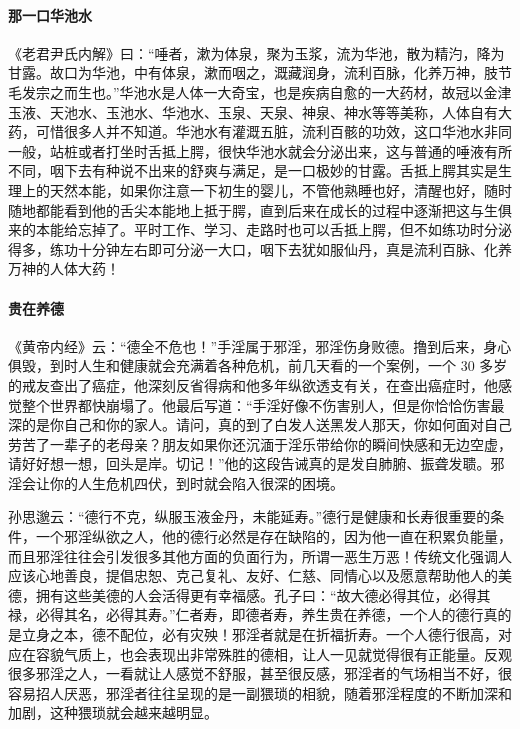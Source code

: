 \paragraph{那一口华池水}

《老君尹氏内解》曰：“唾者，漱为体泉，聚为玉浆，流为华池，散为精汋，降为甘露。故口为华池，中有体泉，漱而咽之，溉藏润身，流利百脉，化养万神，肢节毛发宗之而生也。”华池水是人体一大奇宝，也是疾病自愈的一大药材，故冠以金津玉液、天池水、玉池水、华池水、玉泉、天泉、神泉、神水等等美称，人体自有大药，可惜很多人并不知道。华池水有灌溉五脏，流利百骸的功效，这口华池水非同一般，站桩或者打坐时舌抵上腭，很快华池水就会分泌出来，这与普通的唾液有所不同，咽下去有种说不出来的舒爽与满足，是一口极妙的甘露。舌抵上腭其实是生理上的天然本能，如果你注意一下初生的婴儿，不管他熟睡也好，清醒也好，随时随地都能看到他的舌尖本能地上抵于腭，直到后来在成长的过程中逐渐把这与生俱来的本能给忘掉了。平时工作、学习、走路时也可以舌抵上腭，但不如练功时分泌得多，练功十分钟左右即可分泌一大口，咽下去犹如服仙丹，真是流利百脉、化养万神的人体大药！

\paragraph{贵在养德}

《黄帝内经》云：“德全不危也！”手淫属于邪淫，邪淫伤身败德。撸到后来，身心俱毁，到时人生和健康就会充满着各种危机，前几天看的一个案例，一个 30 多岁的戒友查出了癌症，他深刻反省得病和他多年纵欲透支有关，在查出癌症时，他感觉整个世界都快崩塌了。他最后写道：“手淫好像不伤害别人，但是你恰恰伤害最深的是你自己和你的家人。请问，真的到了白发人送黑发人那天，你如何面对自己劳苦了一辈子的老母亲？朋友如果你还沉湎于淫乐带给你的瞬间快感和无边空虚，请好好想一想，回头是岸。切记！”他的这段告诫真的是发自肺腑、振聋发聩。邪淫会让你的人生危机四伏，到时就会陷入很深的困境。

孙思邈云：“德行不克，纵服玉液金丹，未能延寿。”德行是健康和长寿很重要的条件，一个邪淫纵欲之人，他的德行必然是存在缺陷的，因为他一直在积累负能量，而且邪淫往往会引发很多其他方面的负面行为，所谓一恶生万恶！传统文化强调人应该心地善良，提倡忠恕、克己复礼、友好、仁慈、同情心以及愿意帮助他人的美德，拥有这些美德的人会活得更有幸福感。孔子曰：“故大德必得其位，必得其禄，必得其名，必得其寿。”仁者寿，即德者寿，养生贵在养德，一个人的德行真的是立身之本，德不配位，必有灾殃！邪淫者就是在折福折寿。一个人德行很高，对应在容貌气质上，也会表现出非常殊胜的德相，让人一见就觉得很有正能量。反观很多邪淫之人，一看就让人感觉不舒服，甚至很反感，邪淫者的气场相当不好，很容易招人厌恶，邪淫者往往呈现的是一副猥琐的相貌，随着邪淫程度的不断加深和加剧，这种猥琐就会越来越明显。

